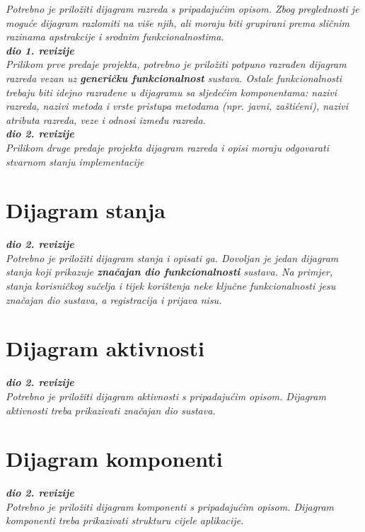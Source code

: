 			\textit{Potrebno je priložiti dijagram razreda s pripadajućim opisom. Zbog preglednosti je moguće dijagram razlomiti na više njih, ali moraju biti grupirani prema sličnim razinama apstrakcije i srodnim funkcionalnostima.}\\
			
			\textbf{\textit{dio 1. revizije}}\\
			
			\textit{Prilikom prve predaje projekta, potrebno je priložiti potpuno razrađen dijagram razreda vezan uz \textbf{generičku funkcionalnost} sustava. Ostale funkcionalnosti trebaju biti idejno razrađene u dijagramu sa sljedećim komponentama: nazivi razreda, nazivi metoda i vrste pristupa metodama (npr. javni, zaštićeni), nazivi atributa razreda, veze i odnosi između razreda.}\\
			
			\textbf{\textit{dio 2. revizije}}\\			
			
			\textit{Prilikom druge predaje projekta dijagram razreda i opisi moraju odgovarati stvarnom stanju implementacije}
			
			
			
			\eject
		
		\section{Dijagram stanja}
			
			
			\textbf{\textit{dio 2. revizije}}\\
			
			\textit{Potrebno je priložiti dijagram stanja i opisati ga. Dovoljan je jedan dijagram stanja koji prikazuje \textbf{značajan dio funkcionalnosti} sustava. Na primjer, stanja korisničkog sučelja i tijek korištenja neke ključne funkcionalnosti jesu značajan dio sustava, a registracija i prijava nisu. }
			
			
			\eject 
		
		\section{Dijagram aktivnosti}
			
			\textbf{\textit{dio 2. revizije}}\\
			
			 \textit{Potrebno je priložiti dijagram aktivnosti s pripadajućim opisom. Dijagram aktivnosti treba prikazivati značajan dio sustava.}
			
			\eject
		\section{Dijagram komponenti}
		
			\textbf{\textit{dio 2. revizije}}\\
		
			 \textit{Potrebno je priložiti dijagram komponenti s pripadajućim opisom. Dijagram komponenti treba prikazivati strukturu cijele aplikacije.}

